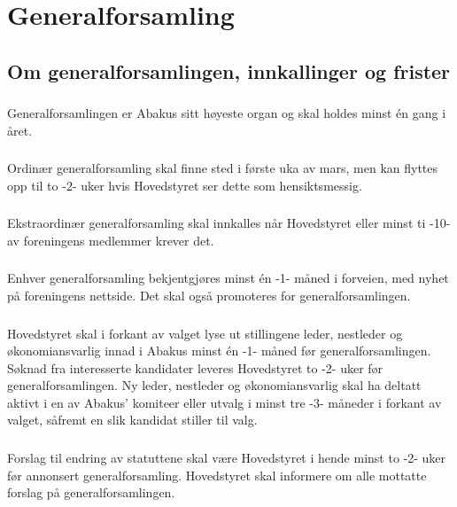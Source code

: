 \section{Generalforsamling}
\subsection{Om generalforsamlingen, innkallinger og frister}
\subsubsection{}
Generalforsamlingen er Abakus sitt høyeste organ og skal holdes minst én
gang i året.

\subsubsection{}
Ordinær generalforsamling skal finne sted i første uka av mars, men kan
flyttes opp til to -2- uker hvis Hovedstyret ser dette som hensiktsmessig.

\subsubsection{}
Ekstraordinær generalforsamling skal innkalles når Hovedstyret eller minst
ti -10- av foreningens medlemmer krever det.

\subsubsection{}
Enhver generalforsamling bekjentgjøres minst én -1- måned i forveien, med
nyhet på foreningens nettside. Det skal også promoteres for generalforsamlingen.

\subsubsection{}
Hovedstyret skal i forkant av valget lyse ut stillingene leder, nestleder og
økonomiansvarlig innad i Abakus minst én -1- måned før generalforsamlingen.
Søknad fra interesserte kandidater leveres Hovedstyret to -2- uker før
generalforsamlingen. Ny leder, nestleder og økonomiansvarlig skal ha deltatt
aktivt i en av Abakus’ komiteer eller utvalg i minst tre -3- måneder i forkant
av valget, såfremt en slik kandidat stiller til valg.

\subsubsection{}
Forslag til endring av statuttene skal være Hovedstyret i hende minst to -2-
uker før annonsert generalforsamling. Hovedstyret skal informere om alle
mottatte forslag på generalforsamlingen.

